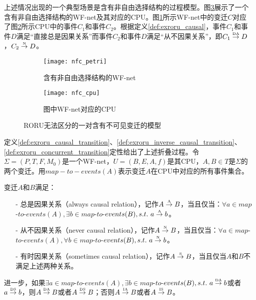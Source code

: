 上述情况出现的一个典型场景是含有非自由选择结构的过程模型。图\ref{fig:nfc_exroru}展示了一个含有非自由选择结构的WF-net及其对应的CPU。图\ref{fig:nfc_petri}所示WF-net中的变迁$C$对应了图\ref{fig:nfc_cpu}所示CPU中的事件$C_{1}$和事件$C_{2}$。根据定义\ref{def:exroru_causal}，事件$C_{1}$和事件$D$满足“直接总是因果关系”而事件$C_{2}$和事件$D$满足“从不因果关系”，即$C_{1}\overset{\text{\tiny{DA}}}{\rightarrow}D$，$C_{2}\overset{\text{\tiny{N}}}{\rightarrow}D$。

\begin{figure}[htbp]
  \centering
  \begin{subfigure}{1\textwidth}
    \centering
    \texttt{[image: nfc\_petri]}
    \caption{含有非自由选择结构的WF-net}
    \label{fig:nfc_petri}
  \end{subfigure}
  \begin{subfigure}{1\textwidth}
    \vspace{1em}
    \centering
    \texttt{[image: nfc\_cpu]}
    \caption{图中WF-net对应的CPU}
    \label{fig:nfc_cpu}
  \end{subfigure}
  \caption{RORU无法区分的一对含有不可见变迁的模型}
  \label{fig:nfc_exroru}
\end{figure}

定义\ref{def:exroru_causal_transition}、\ref{def:exroru_inverse_causal_transition}、\ref{def:exroru_concurrent_transition}定性给出了上述折叠过程。令$\Sigma=(P,T,F,M_{0})$是一个WF-net，$U=(B,E,A,f)$是其CPU，$A,B\in T$是$\Sigma$的两个变迁。用$map-to-events(A)$表示变迁$A$在CPU中对应的所有事件集合。

\begin{definition}[变迁间扩展不确定性精炼因果关系]\label{def:exroru_causal_transition}
变迁$A$和$B$满足：
  \begin{itemize}
    \item[-] 总是因果关系（always causal relation），记作$A\overset{\text{\tiny{A}}}{\rightarrow}B$，当且仅当：$\forall a\in map$-$to$-$events(A),\exists b\in map$-$to$-$events(B),s.t.~a\overset{\text{\tiny{A}}}{\rightarrow}b$。
    \item[-] 从不因果关系（never causal relation），记作$A\overset{\text{\tiny{N}}}{\rightarrow}B$，当且仅当：$\forall a\in map$-$to$-$events(A),\forall b\in map$-$to$-$events(B),s.t.~a\overset{\text{\tiny{N}}}{\rightarrow}b$。
    \item[-] 有时因果关系（sometimes causal relation），记作$A\overset{\text{\tiny{S}}}{\rightarrow}B$，当且仅当$A$和$B$不满足上述两种关系。
  \end{itemize}
进一步，如果$\exists a\in map$-$to$-$events(A),\exists b\in map$-$to$-$events(B),s.t.~a\overset{\text{\tiny{DA}}}{\rightarrow}b$或者$a\overset{\text{\tiny{DS}}}{\rightarrow}b$，则$A\overset{\text{\tiny{DA}}}{\rightarrow}B$或者$A\overset{\text{\tiny{DS}}}{\rightarrow}B$；否则$A\overset{\text{\tiny{IA}}}{\rightarrow}B$或者$A\overset{\text{\tiny{IS}}}{\rightarrow}B$。
\end{definition}


